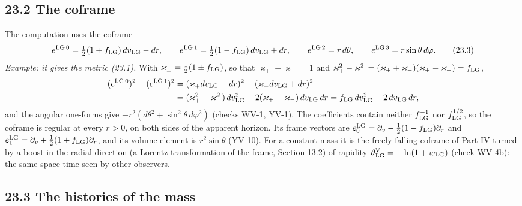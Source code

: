 \documentclass[
  10pt,
]{article}
\begin{document}
\hypertarget{the-coframe}{%
\subsection{23.2 The coframe}\label{the-coframe}}

The computation uses the coframe
\[e^{{\rm LG}\,0}=\tfrac12(1+f_{\rm LG})\,dv_{\rm LG}-dr,\qquad e^{{\rm LG}\,1}=\tfrac12(1-f_{\rm LG})\,dv_{\rm LG}+dr,\qquad e^{{\rm LG}\,2}=r\,d\theta,\qquad e^{{\rm LG}\,3}=r\sin\theta\,d\varphi.\tag{23.3}\]
\emph{Example: it gives the metric (23.1).} With
\(\varkappa_\pm=\tfrac12(1\pm f_{\rm LG})\), so that
\(\varkappa_++\varkappa_-=1\) and
\(\varkappa_+^2-\varkappa_-^2=(\varkappa_++\varkappa_-)(\varkappa_+-\varkappa_-)=f_{\rm LG}\),
\[\begin{aligned}(e^{{\rm LG}\,0})^2-(e^{{\rm LG}\,1})^2&=(\varkappa_+dv_{\rm LG}-dr)^2-(\varkappa_-dv_{\rm LG}+dr)^2\\&=(\varkappa_+^2-\varkappa_-^2)\,dv_{\rm LG}^2-2(\varkappa_++\varkappa_-)\,dv_{\rm LG}\,dr=f_{\rm LG}\,dv_{\rm LG}^2-2\,dv_{\rm LG}\,dr,\end{aligned}\]
and the angular one-forms give
\(-r^2(d\theta^2+\sin^2\theta\,d\varphi^2)\) (checks WV-1, YV-1). The
coefficients contain neither \(f_{\rm LG}^{-1}\) nor
\(f_{\rm LG}^{1/2}\), so the coframe is regular at every \(r>0\), on
both sides of the apparent horizon. Its frame vectors are
\(e^{\rm LG}_0=\partial_v-\tfrac12(1-f_{\rm LG})\partial_r\) and
\(e^{\rm LG}_1=\partial_v+\tfrac12(1+f_{\rm LG})\partial_r\), and its
volume element is \(r^2\sin\theta\) (YV-10). For a constant mass it is
the freely falling coframe of Part IV turned by a boost in the radial
direction (a Lorentz transformation of the frame, Section 13.2) of
rapidity \(\vartheta^{\rm V}_{\rm LG}=-\ln(1+w_{\rm LG})\) (check
WV-4b): the same space-time seen by other observers.

\hypertarget{the-histories-of-the-mass}{%
\subsection{23.3 The histories of the
mass}\label{the-histories-of-the-mass}}
\end{document}
